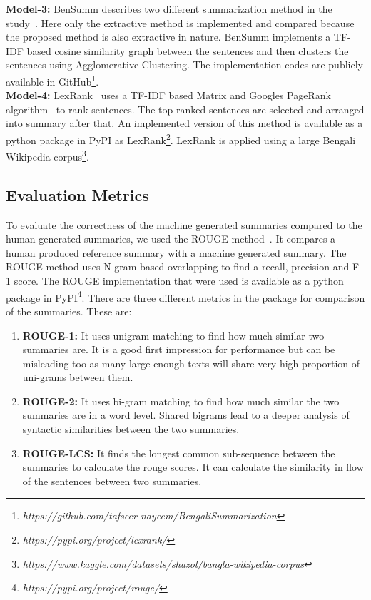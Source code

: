 \textbf{Model-3:} BenSumm describes two different summarization method in the
study~\cite{chowdhury-etal-2021-tfidf-clustering}.
Here only the extractive method is implemented and compared because the proposed method is also extractive in nature.
BenSumm implements a TF-IDF based cosine similarity graph between the sentences and then clusters the sentences using
Agglomerative Clustering.
The implementation codes are publicly available in
GitHub\footnote{\textit{https://github.com/tafseer-nayeem/BengaliSummarization}}.\\

\textbf{Model-4:} LexRank~\cite{Erkan-lexRank-2004} uses a TF-IDF based Matrix and Googles
PageRank algorithm~\cite{page-PageRank-1999} to rank sentences.
The top ranked sentences are selected and arranged into summary after that.
An implemented version of this method is available as a python package in PyPI as
LexRank\footnote{\textit{https://pypi.org/project/lexrank/}}.
LexRank is applied using a large Bengali Wikipedia
corpus\footnote{\textit{https://www.kaggle.com/datasets/shazol/bangla-wikipedia-corpus}}.

\subsection{Evaluation Metrics}\label{subsec:evaluation-metrics}
To evaluate the correctness of the machine generated summaries compared to the human
generated summaries, we used the ROUGE method~\cite{lin-2004-rouge}.
It compares a human produced reference summary with a machine generated summary.
The ROUGE method uses N-gram based overlapping to find a recall, precision and F-1 score.
The ROUGE implementation that were used is available as a python package in
PyPI\footnote{\textit{https://pypi.org/project/rouge/}}.
There are three different metrics in the package for comparison of the summaries.
These are:

\begin{enumerate}
    \item \textbf{ROUGE-1:} It uses unigram matching to find how much similar two summaries are.
    It is a good first impression for performance but can be misleading too as many large enough texts
    will share very high proportion of uni-grams between them.
    \item \textbf{ROUGE-2:} It uses bi-gram matching to find how much similar the two summaries are in a word level.
    Shared bigrams lead to a deeper analysis of syntactic similarities between the two summaries.
    \item \textbf{ROUGE-LCS:} It finds the longest common sub-sequence between the summaries to calculate
    the rouge scores.
    It can calculate the similarity in flow of the sentences between two summaries.
\end{enumerate}

